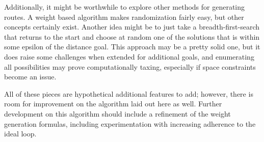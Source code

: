 \documentclass[twocolumn,12pt]{article}
\begin{document}
Additionally, it might be worthwhile to explore other methods for generating
routes. A weight based algorithm makes randomization fairly easy, but other
concepts certainly exist. Another idea might be to just take a
breadth-first-search that returns to the start and choose at random one of the
solutions that is within some epsilon of the distance goal. This approach may
be a pretty solid one, but it does raise some challenges when extended for
additional goals, and enumerating all possibilities may prove computationally
taxing, especially if space constraints become an issue.

All of these pieces are hypothetical additional features to add; however, there
is room for improvement on the algorithm laid out here as well. Further
development on this algorithm should include a refinement of the weight
generation formulas, including experimentation with increasing adherence to the
ideal loop.


\raggedright

\end{document}
